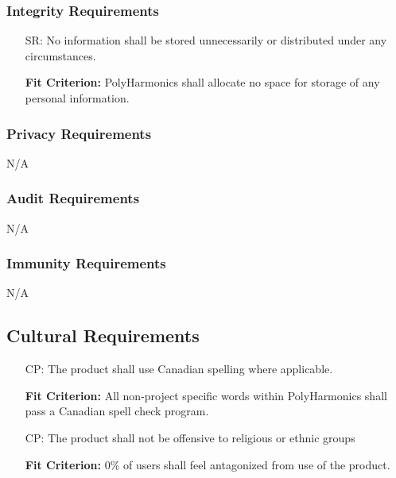 \documentclass[12pt]{article}
\newcounter{secunum}
\newcounter{culnum}
\newcommand{\progname}{PolyHarmonics}
\begin{document}
\subsubsection{Integrity Requirements}

\noindent \begin{itemize}
\item[SR\refstepcounter{secunum}\thesecunum\label{NF_sec2}:] No information
  shall be stored unnecessarily or distributed under any circumstances.

  \textbf{Fit Criterion:} \progname{} shall allocate no space for storage of any
  personal information.
\end{itemize}

\subsubsection{Privacy Requirements}

N/A

\subsubsection{Audit Requirements}

N/A

\subsubsection{Immunity Requirements}

N/A

\subsection{Cultural Requirements}

\noindent \begin{itemize}
\item[CP\refstepcounter{culnum}\theculnum\label{NF_cul1}:] The product shall use
  Canadian spelling where applicable.

\textbf{Fit Criterion:} All non-project specific words within \progname{}
 shall pass a Canadian spell check program.

\item[CP\refstepcounter{culnum}\theculnum\label{NF_cul2}:] The product shall not
  be offensive to religious or ethnic groups

  \textbf{Fit Criterion:} 0\% of users shall feel antagonized from use of the
  product.
\end{itemize}
\end{document}
